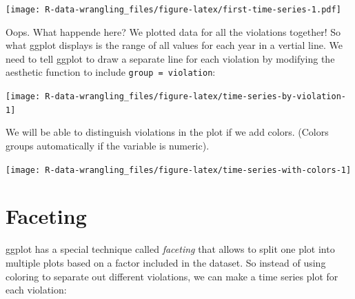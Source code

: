 \documentclass[]{book}
\newenvironment{Shaded}{\begin{snugshade}}{\end{snugshade}}
\newcommand{\DataTypeTok}[1]{\textcolor[rgb]{0.13,0.29,0.53}{#1}}
\newcommand{\KeywordTok}[1]{\textcolor[rgb]{0.13,0.29,0.53}{\textbf{#1}}}
\newcommand{\NormalTok}[1]{#1}
\newcommand{\OperatorTok}[1]{\textcolor[rgb]{0.81,0.36,0.00}{\textbf{#1}}}
\newcommand{\StringTok}[1]{\textcolor[rgb]{0.31,0.60,0.02}{#1}}
\begin{document}
\texttt{[image: R-data-wrangling\_files/figure-latex/first-time-series-1.pdf]}

Oops. What happende here? We plotted data for all the violations together! So what ggplot displays is the range of all values for each year in a vertial line. We need to tell ggplot to draw a separate line for each violation by modifying the aesthetic function to include \texttt{group\ =\ violation}:

\begin{Shaded}
\end{Shaded}

\texttt{[image: R-data-wrangling\_files/figure-latex/time-series-by-violation-1]}

We will be able to distinguish violations in the plot if we add colors. (Colors groups automatically if the variable is numeric).

\begin{Shaded}
\end{Shaded}

\texttt{[image: R-data-wrangling\_files/figure-latex/time-series-with-colors-1]}

\hypertarget{faceting}{%
\section{Faceting}\label{faceting}}

ggplot has a special technique called \emph{faceting} that allows to split one plot
into multiple plots based on a factor included in the dataset. So instead of using coloring to separate out different violations, we can make a time series plot for each violation:
\end{document}
